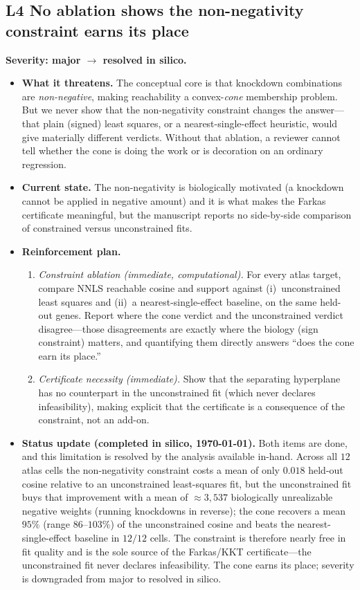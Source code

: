 \documentclass[11pt]{article}
\newcommand{\sev}[2]{\textcolor{#1}{\textbf{#2}}}
\begin{document}
\subsection{L4 \quad No ablation shows the non-negativity constraint earns its place}
\sev{sev3}{Severity: major $\rightarrow$ resolved in silico.}
\begin{itemize}
\item[] \textbf{What it threatens.} The conceptual core is that knockdown combinations are
\emph{non-negative}, making reachability a convex-\emph{cone} membership problem. But we never
show that the non-negativity constraint changes the answer---that plain (signed) least squares,
or a nearest-single-effect heuristic, would give materially different verdicts. Without that
ablation, a reviewer cannot tell whether the cone is doing the work or is decoration on an
ordinary regression.
\item[] \textbf{Current state.} The non-negativity is biologically motivated (a knockdown cannot
be applied in negative amount) and it is what makes the Farkas certificate meaningful, but the
manuscript reports no side-by-side comparison of constrained versus unconstrained fits.
\item[] \textbf{Reinforcement plan.}
\begin{enumerate}
\item \emph{Constraint ablation (immediate, computational).} For every atlas target, compare
NNLS reachable cosine and support against (i)~unconstrained least squares and (ii)~a
nearest-single-effect baseline, on the same held-out genes. Report where the cone verdict and
the unconstrained verdict disagree---those disagreements are exactly where the biology (sign
constraint) matters, and quantifying them directly answers ``does the cone earn its place.''
\item \emph{Certificate necessity (immediate).} Show that the separating hyperplane has no
counterpart in the unconstrained fit (which never declares infeasibility), making explicit that
the certificate is a consequence of the constraint, not an add-on.
\end{enumerate}
\item[] \textbf{Status update (completed in silico, \today).} Both items are done, and this
limitation is resolved by the analysis available in-hand. Across all $12$ atlas cells the
non-negativity constraint costs a mean of only $0.018$ held-out cosine relative to an
unconstrained least-squares fit, but the unconstrained fit buys that improvement with a mean of
$\approx\!3{,}537$ biologically unrealizable negative weights (running knockdowns in reverse);
the cone recovers a mean $95\%$ (range $86$--$103\%$) of the unconstrained cosine and beats the
nearest-single-effect baseline in $12/12$ cells. The constraint is therefore nearly free in fit
quality and is the sole source of the Farkas/KKT certificate---the unconstrained fit never
declares infeasibility. The cone earns its place; severity is downgraded from major to resolved
in silico.
\end{itemize}
\end{document}
